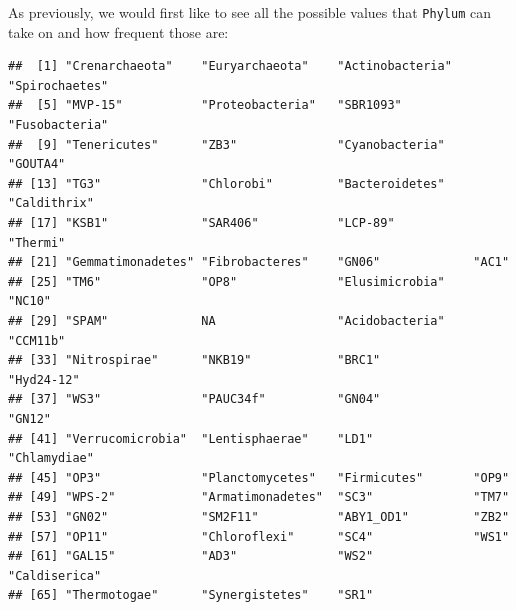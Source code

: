 \documentclass[
]{book}
\newenvironment{Shaded}{\begin{snugshade}}{\end{snugshade}}
\newcommand{\CommentTok}[1]{\textcolor[rgb]{0.56,0.35,0.01}{\textit{#1}}}
\newcommand{\FunctionTok}[1]{\textcolor[rgb]{0.00,0.00,0.00}{#1}}
\newcommand{\NormalTok}[1]{#1}
\newcommand{\SpecialCharTok}[1]{\textcolor[rgb]{0.00,0.00,0.00}{#1}}
\begin{document}
As previously, we would first like to see all the possible values that
\texttt{Phylum} can take on and how frequent those are:

\begin{Shaded}
\end{Shaded}

\begin{verbatim}
##  [1] "Crenarchaeota"    "Euryarchaeota"    "Actinobacteria"   "Spirochaetes"    
##  [5] "MVP-15"           "Proteobacteria"   "SBR1093"          "Fusobacteria"    
##  [9] "Tenericutes"      "ZB3"              "Cyanobacteria"    "GOUTA4"          
## [13] "TG3"              "Chlorobi"         "Bacteroidetes"    "Caldithrix"      
## [17] "KSB1"             "SAR406"           "LCP-89"           "Thermi"          
## [21] "Gemmatimonadetes" "Fibrobacteres"    "GN06"             "AC1"             
## [25] "TM6"              "OP8"              "Elusimicrobia"    "NC10"            
## [29] "SPAM"             NA                 "Acidobacteria"    "CCM11b"          
## [33] "Nitrospirae"      "NKB19"            "BRC1"             "Hyd24-12"        
## [37] "WS3"              "PAUC34f"          "GN04"             "GN12"            
## [41] "Verrucomicrobia"  "Lentisphaerae"    "LD1"              "Chlamydiae"      
## [45] "OP3"              "Planctomycetes"   "Firmicutes"       "OP9"             
## [49] "WPS-2"            "Armatimonadetes"  "SC3"              "TM7"             
## [53] "GN02"             "SM2F11"           "ABY1_OD1"         "ZB2"             
## [57] "OP11"             "Chloroflexi"      "SC4"              "WS1"             
## [61] "GAL15"            "AD3"              "WS2"              "Caldiserica"     
## [65] "Thermotogae"      "Synergistetes"    "SR1"
\end{verbatim}

\begin{Shaded}
\end{Shaded}
\end{document}
